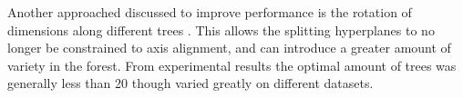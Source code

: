 Another approached discussed to improve performance is the rotation of dimensions along different trees \citep{silpa2008optimised}.  This allows the splitting hyperplanes to no longer be constrained to axis alignment, and can introduce a greater amount of variety in the forest.  From experimental results \citep{muja_flann_2009} the optimal amount of trees was generally less than 20 though varied greatly on different datasets.